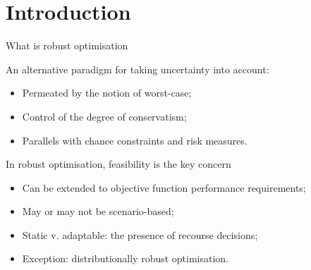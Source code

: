 \section{Introduction}


\begin{frame}{What is robust optimisation}

	An alternative paradigm for taking uncertainty into account:
	\begin{itemize}
		\item Permeated by the notion of \alert{worst-case};
		\item Control of the degree of \alert{conservatism};	
		\item Parallels with \alert{chance constraints} and \alert{risk measures}.
	\end{itemize}
	
	\pause
	In robust optimisation, \alert{feasibility} is the key concern
	\begin{itemize}
		\item Can be extended to objective function performance requirements;
		\item May or may not be \alert{scenario-based};
		\item Static v. adaptable: the presence of \alert{recourse decisions};
		\item Exception: distributionally robust optimisation.	
	\end{itemize}
	
\end{frame}

